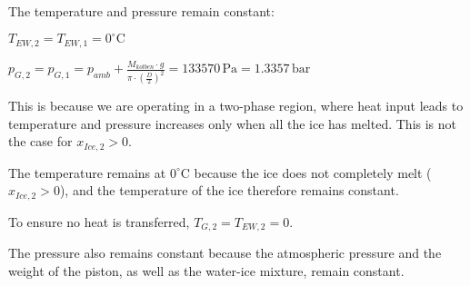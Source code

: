The temperature and pressure remain constant:  

\( T_{EW,2} = T_{EW,1} = 0^\circ \text{C} \)  

\( p_{G,2} = p_{G,1} = p_{amb} + \frac{M_{kolben} \cdot g}{\pi \cdot (\frac{D}{2})^2} = 133570 \, \text{Pa} = 1.3357 \, \text{bar} \)  

This is because we are operating in a two-phase region, where heat input leads to temperature and pressure increases only when all the ice has melted. This is not the case for \( x_{Ice,2} > 0 \).  

The temperature remains at \( 0^\circ \text{C} \) because the ice does not completely melt (\( x_{Ice,2} > 0 \)), and the temperature of the ice therefore remains constant.  

To ensure no heat is transferred, \( T_{G,2} = T_{EW,2} = 0 \).  

The pressure also remains constant because the atmospheric pressure and the weight of the piston, as well as the water-ice mixture, remain constant.